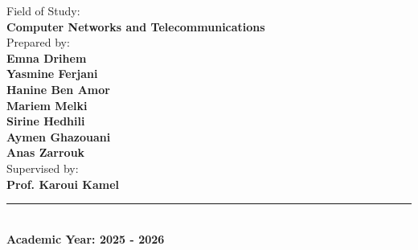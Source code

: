 \documentclass[12pt,a4paper]{report}
\begin{document}
\begin{center}
    \Large{Field of Study:}\\
    \Large\textbf{Computer Networks and Telecommunications}\\[1cm]
    
    \Large{Prepared by:}\\
    \textbf{\Large Emna Drihem}\\
    \textbf{\Large Yasmine Ferjani}\\
    \textbf{\Large Hanine Ben Amor}\\
    \textbf{\Large Mariem Melki}\\
    \textbf{\Large Sirine Hedhili}\\
    \textbf{\Large Aymen Ghazouani}\\
    \textbf{\Large Anas Zarrouk}\\[1cm]
    
    \Large{Supervised by:}\\
    \Large\textbf{Prof. Karoui Kamel}\\[0.5cm]
    
    \rule{0.8\textwidth}{0.3pt}\\[1cm]
    \textbf{Academic Year: 2025 - 2026}

%
\end{center}
\newpage
\tableofcontents
\newpage







\end{document}
